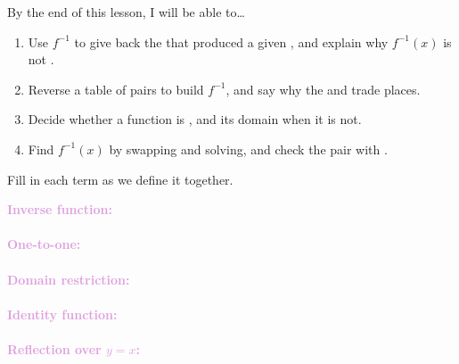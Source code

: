 \documentclass[10pt]{article}
\begin{document}

\vspace{0.12in}

\begin{objectivebox}
By the end of this lesson, I will be able to\ldots
\begin{enumerate}[itemsep=2pt]
  \item Use $f^{-1}$ to give back the \blank{2.2cm} that produced a given
        \blank{2.2cm}, and explain why $f^{-1}(x)$ is not
        \blank{1.6cm}.
  \item Reverse a table of pairs to build $f^{-1}$, and say why the
        \blank{2cm} and \blank{1.8cm} trade places.
  \item Decide whether a function is \blank{2.4cm}, and \blank{2.4cm} its
        domain when it is not.
  \item Find $f^{-1}(x)$ by swapping and solving, and check the pair with
        \blank{2.8cm}.
\end{enumerate}
\end{objectivebox}

\vspace{0.1in}

\boxguard
\begin{vocabbox}
Fill in each term as we define it together.
\par\vspace{2pt}
\noindent\textbf{\textcolor{plum}{Inverse function:}}\\[1pt]
\writeline\\[3pt]
\noindent\textbf{\textcolor{plum}{One-to-one:}}\\[1pt]
\writeline\\[3pt]
\noindent\textbf{\textcolor{plum}{Domain restriction:}}\\[1pt]
\writeline\\[3pt]
\noindent\textbf{\textcolor{plum}{Identity function:}}\\[1pt]
\writeline\\[3pt]
\noindent\textbf{\textcolor{plum}{Reflection over $y = x$:}}\\[1pt]
\writeline
\end{vocabbox}

\vspace{0.1in}
\end{document}
